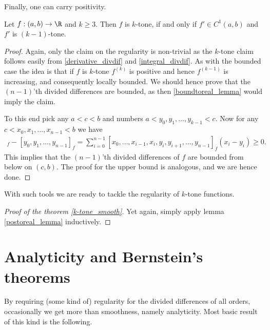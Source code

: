 Finally, one can carry positivity.

\begin{lem}\label{postoreal_lemma}
	Let $f : (a, b) \to \R$ and $k \geq 3$. Then $f$ is $k$-tone, if and only if $f' \in C^{1}(a, b)$ and $f'$ is $(k - 1)$-tone.
\end{lem}
\begin{proof}
	Again, only the claim on the regularity is non-trivial as the $k$-tone claim follows easily from  \ref{derivative_divdif} and \ref{integral_divdif}. As with the bounded case the idea is that if $f$ is $k$-tone $f^{(k)}$ is positive and hence $f^{(k - 1)}$ is increasing, and consequently locally bounded. We should hence prove that the $(n - 1)$'th divided differences are bounded, as then \ref{boundtoreal_lemma} would imply the claim.

	To this end pick any $a < c < b$ and numbers $a < y_{0}, y_{1}, \ldots, y_{k - 1} < c$. Now for any $c < x_{0}, x_{1}, \ldots, x_{n - 1} < b$ we have
	\begin{align*}
		[x_{0}, x_{1}, \ldots, x_{n - 1}]_{f} - [y_{0}, y_{1}, \ldots, y_{n - 1}]_{f} = \sum_{i = 0}^{n - 1} [x_{0}, \ldots, x_{i - 1}, x_{i}, y_{i}, y_{i + 1}, \ldots, y_{n - 1}]_{f} (x_{i} - y_{i}) \geq 0.
	\end{align*}
	This implies that the $(n - 1)$'th divided differences of $f$ are bounded from below on $(c, b)$. The proof for the upper bound is analogous, and we are hence done.
\end{proof}

With such tools we are ready to tackle the regularity of $k$-tone functions.

\begin{proof}[Proof of the theorem \ref{k-tone_smooth}]
	Yet again, simply apply lemma \ref{postoreal_lemma} inductively.
\end{proof}

\section{Analyticity and Bernstein's theorems}

By requiring (some kind of) regularity for the divided differences of all orders, occasionally we get more than smoothness, namely analyticity. Most basic result of this kind is the following.

